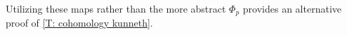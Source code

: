 Utilizing these maps rather than the more abstract $\Phi_p$ provides an alternative proof of \cref{T: cohomology kunneth}.

\begin{comment}
	Dev's sketched elementary proof \colon

	Use pullback of cross product after showing that cross product agrees with singular cross product using the cubical structure as intermediary as in flows.
	In particular, given $V$ and $W$ then $V \times W = (V \times M) \cap (M \times V)$ should act on the cube $\sigma \times \tau$ as $W(\sigma)V(\tau)$.

	\begin{definition}
		Suppose $M$ and $N$ are manifolds.
		Then there is a product map $C^*_\Gamma(M) \otimes C^*_\Gamma(N) \to C^*_\Gamma(M \times N)$ that takes geometric cochains $\uW \in C^*_\Gamma(M)$ and $\uV \in C^*_\Gamma(N)$ represented by $r_W \colon W \to M$ and $r_V \colon V \to N$ to the cochain $\uW \times \uV$ represented by $r_W \times r_V \colon W \times V \to M \times N$ with the product co-orientation.
		In other words, if $(\beta_W,\beta_M)$ and $(\beta_V,\beta_N)$ are the corresponding co-orientations of $\uW$ and $\uV$, then the product co-orientation is $(\beta_W \wedge \beta_V,\beta_M \wedge \beta_N)$.
		By linear extension we obtain the \textbf{(external) cross product} map $C^*_\Gamma(M) \otimes C^*_\Gamma(N) \to C^*_\Gamma(M \times N)$.
	\end{definition}

	\begin{lemma}
		The cochain cross product is a well-defined map.
	\end{lemma}

	\begin{proof}
		If $V$ is trivial via $\rho_W \colon W \to W$, then $W \times V$ is trivial via $\rho_W \times \id_V$.
		Similarly, if $W$ is of small rank then so is $W \times V$.
		Since the sum of geometric cochains is represented by disjoint union, we have $(W_1\pm W_2) \times V = (W_1 \times V)\pm (W_2 \times V)$.
		So if $W_1-W_2 \in Q^*(M)$ then $W_1 \times V- W_2 \times V = (W_1-W_2) \times V \in Q^*(M \times N)$.
		So the cross product is independent of representative for $\uW$, and similarly it is independent of the choice of representative for $\uV$.

		To see that we have a chain map, we observe that \red{PUT SOMETHING IN THE CO-ORIENTATION SECTION}.
	\end{proof}


\end{comment}
